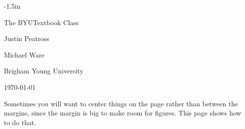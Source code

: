\thispagestyle{empty}
\begin{adjustwidth}{}{-1.5in}

 \centering
 \vspace{1in}
 \Huge The BYUTextbook Class
 \normalsize
 \vspace{1in}

 Justin Peatross

 Michael Ware

 Brigham Young University

 \vspace{1in}

\today

\vspace{1in}

Sometimes you will want to center things on the page rather than
between the margins, since the margin is big to make room for
figures.  This page shows how to do that.

\end{adjustwidth}

\cleardoublepage